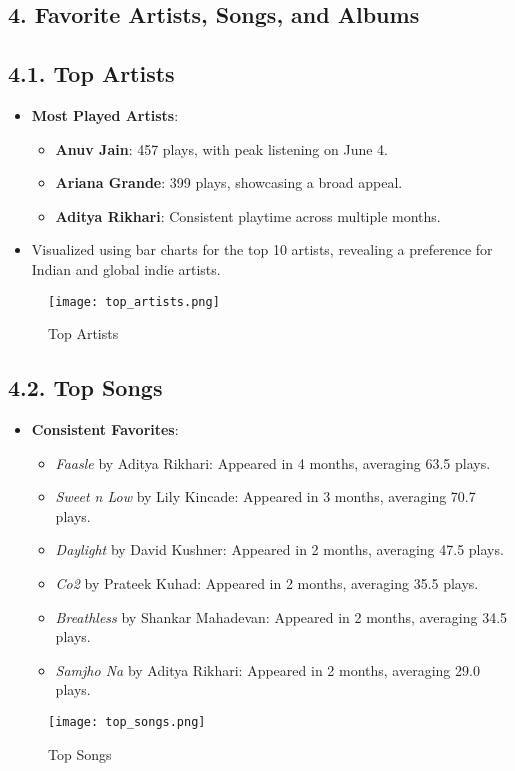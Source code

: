 \documentclass[12pt]{article}
\begin{document}
\begin{itemize}
\section*{4. Favorite Artists, Songs, and Albums}
\subsection*{4.1. Top Artists}
\begin{itemize}
    \item \textbf{Most Played Artists}:
    \begin{itemize}
        \item \textbf{Anuv Jain}: 457 plays, with peak listening on June 4.
        \item \textbf{Ariana Grande}: 399 plays, showcasing a broad appeal.
        \item \textbf{Aditya Rikhari}: Consistent playtime across multiple months.
    \end{itemize}
    \item Visualized using bar charts for the top 10 artists, revealing a preference for Indian and global indie artists.
\end{itemize}
\begin{figure}[H]
    \centering
    \texttt{[image: top\_artists.png]}
    \caption{Top Artists}
    \label{fig:enter-label}
\end{figure}

\subsection*{4.2. Top Songs}
\begin{itemize}
    \item \textbf{Consistent Favorites}:
    \begin{itemize}
        \item \textit{Faasle} by Aditya Rikhari: Appeared in 4 months, averaging 63.5 plays.
        \item \textit{Sweet n Low} by Lily Kincade: Appeared in 3 months, averaging 70.7 plays.
        \item \textit{Daylight} by David Kushner: Appeared in 2 months, averaging 47.5 plays.
        \item \textit{Co2} by Prateek Kuhad: Appeared in 2 months, averaging 35.5 plays.
        \item \textit{Breathless} by Shankar Mahadevan: Appeared in 2 months, averaging 34.5 plays.
        \item \textit{Samjho Na} by Aditya Rikhari: Appeared in 2 months, averaging 29.0 plays.
    \end{itemize}
\end{itemize}
\begin{figure}[H]
    \centering
    \texttt{[image: top\_songs.png]}
    \caption{Top Songs}
    \label{fig:enter-label}
\end{figure}



\end{itemize}
\end{document}
